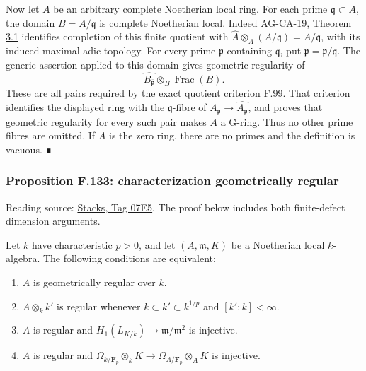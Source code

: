 \documentclass[11pt,a4paper,openany]{report}
\providecommand{\tightlist}{\setlength{\itemsep}{0pt}\setlength{\parskip}{0pt}}
\begin{document}
Now let \(A\) be an arbitrary complete Noetherian local ring. For each prime \(\mathfrak q\subset A\), the domain \(B=A/\mathfrak q\) is complete Noetherian local. Indeed \href{https://github.com/KokunoYumeto/open-math-courses/blob/d02d0a3669f42579db037cd44de1d113fdd770a1/docs/courses/AG-CA/src/completion.md}{AG-CA-19, Theorem 3.1} identifies completion of this finite quotient with \(\widehat A\otimes_A(A/\mathfrak q)=A/\mathfrak q\), with its induced maximal-adic topology. For every prime \(\mathfrak p\) containing \(\mathfrak q\), put \(\overline{\mathfrak p}=\mathfrak p/\mathfrak q\). The generic assertion applied to this domain gives geometric regularity of \[\widehat{B_{\overline{\mathfrak p}}}\otimes_B\operatorname{Frac}(B).\] These are all pairs required by the exact quotient criterion \hyperref[AG-RG-S05-more-algebra-lemma-check-G-ring-easy]{F.99}. That criterion identifies the displayed ring with the \(\mathfrak q\)-fibre of \(A_{\mathfrak p}\to\widehat{A_{\mathfrak p}}\), and proves that geometric regularity for every such pair makes \(A\) a G-ring. Thus no other prime fibres are omitted. If \(A\) is the zero ring, there are no primes and the definition is vacuous. ∎

\label{AG-RG-S05-more-algebra-proposition-characterization-geometrically-regular}

\subsubsection{Proposition F.133: characterization geometrically regular}\label{AG-RG-S05-proposition-f.133-characterization-geometrically-regular}

Reading source: \href{https://stacks.math.columbia.edu/tag/07E5}{Stacks, Tag 07E5}. The proof below includes both finite-defect dimension arguments.

Let \(k\) have characteristic \(p>0\), and let \((A,\mathfrak m,K)\) be a Noetherian local \(k\)-algebra. The following conditions are equivalent:

\begin{enumerate}
\def\labelenumi{\arabic{enumi}.}
\tightlist
\item
  \(A\) is geometrically regular over \(k\).
\item
  \(A\otimes_k k'\) is regular whenever \(k\subset k'\subset k^{1/p}\) and \([k':k]<\infty\).
\item
  \(A\) is regular and \(H_1(L_{K/k})\to\mathfrak m/\mathfrak m^2\) is injective.
\item
  \(A\) is regular and \(\Omega_{k/\mathbf F_p}\otimes_k K\to\Omega_{A/\mathbf F_p}\otimes_A K\) is injective.
\end{enumerate}
\end{document}
